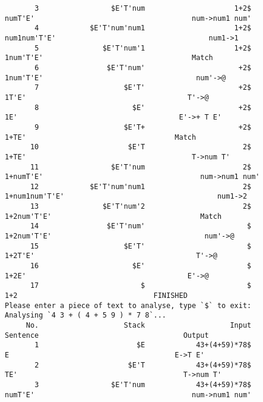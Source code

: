 \documentclass[UTF8]{ctexart}
\begin{document}
\begin{lstlisting}
       3                 $E'T'num                     1+2$                              numT'E'                                     num->num1 num'
       4            $E'T'num'num1                     1+2$                              num1num'T'E'                                    num1->1
       5               $E'T'num'1                     1+2$                              1num'T'E'                                   Match
       6                $E'T'num'                      +2$                             1num'T'E'                                    num'->@
       7                    $E'T'                      +2$                             1T'E'                                      T'->@
       8                      $E'                      +2$                             1E'                                      E'->+ T E'
       9                    $E'T+                      +2$                             1+TE'                                   Match
      10                     $E'T                       2$                            1+TE'                                       T->num T'
      11                 $E'T'num                       2$                            1+numT'E'                                     num->num1 num'
      12            $E'T'num'num1                       2$                            1+num1num'T'E'                                    num1->2
      13               $E'T'num'2                       2$                            1+2num'T'E'                                   Match
      14                $E'T'num'                        $                           1+2num'T'E'                                    num'->@
      15                    $E'T'                        $                           1+2T'E'                                      T'->@
      16                      $E'                        $                           1+2E'                                      E'->@
      17                        $                        $                           1+2                                FINISHED
Please enter a piece of text to analyse, type `$` to exit:
Analysing `4 3 + ( 4 + 5 9 ) * 7 8`...
     No.                    Stack                    Input                      Sentence                                  Output
       1                       $E            43+(4+59)*78$                              E                                       E->T E'
       2                     $E'T            43+(4+59)*78$                              TE'                                       T->num T'
       3                 $E'T'num            43+(4+59)*78$                              numT'E'                                     num->num1 num'

\end{lstlisting}
\end{document}
